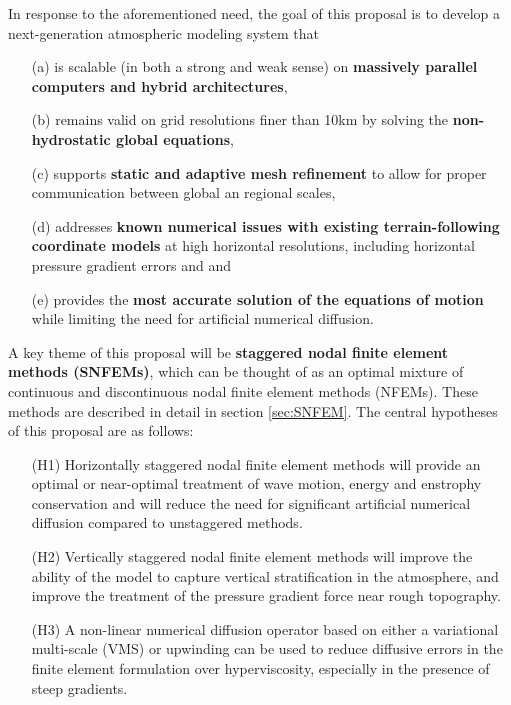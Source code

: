 \documentclass[11pt]{article}
\begin{document}
In response to the aforementioned need, the goal of this proposal is to develop a next-generation atmospheric modeling system that
\vspace{-0.4cm}
\begin{enumerate}
\item[(a)] is scalable (in both a strong and weak sense) on \textbf{massively parallel computers and hybrid architectures},
\item[(b)] remains valid on grid resolutions finer than 10km by solving the \textbf{non-hydrostatic global equations},
\item[(c)] supports \textbf{static and adaptive mesh refinement} to allow for proper communication between global an regional scales,
\item[(d)] addresses \textbf{known numerical issues with existing terrain-following coordinate models} at high horizontal resolutions, including horizontal pressure gradient errors and  and
\item[(e)] provides the \textbf{most accurate solution of the equations of motion} while limiting the need for artificial numerical diffusion. 
\end{enumerate}

\vspace{-0.4cm}
A key theme of this proposal will be \textbf{staggered nodal finite element methods (SNFEMs)}, which can be thought of as an optimal mixture of continuous and discontinuous nodal finite element methods (NFEMs).  These methods are described in detail in section \ref{sec:SNFEM}.  The central hypotheses of this proposal are as follows:

\vspace{-0.4cm}
\begin{itemize}
\item[(H1)] Horizontally staggered nodal finite element methods will provide an optimal or near-optimal treatment of wave motion, energy and enstrophy conservation and will reduce the need for significant artificial numerical diffusion compared to unstaggered methods.

\item[(H2)] Vertically staggered nodal finite element methods will improve the ability of the model to capture vertical stratification in the atmosphere, and improve the treatment of the pressure gradient force near rough topography.

\item[(H3)] A non-linear numerical diffusion operator based on either a variational multi-scale (VMS) or upwinding can be used to reduce diffusive errors in the finite element formulation over hyperviscosity, especially in the presence of steep gradients.
\end{itemize}
\end{document}
